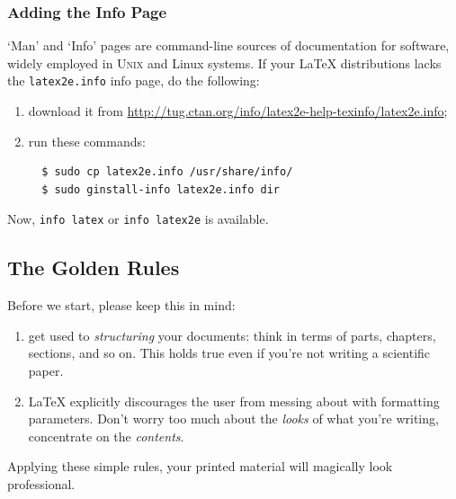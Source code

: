 \documentclass[a4paper,11pt]{article}
\def\unix    {\textsc{Unix}}
\newcommand{\cmdline}[1]
{\texttt{#1}}
\newcommand{\file}[1]
{\texttt{#1}}
\begin{document}

\subsubsection{Adding the Info Page}
\label{sec:infopage}

`Man' and `Info' pages are command-line sources of documentation for
software, widely employed in \unix{} and Linux systems. If your
\LaTeX{} distributions lacks the \file{latex2e.info} info page, do the
following:

\begin{enumerate}
  
  \item download it from
  \url{http://tug.ctan.org/info/latex2e-help-texinfo/latex2e.info};
  
  \item run these commands:
  
  \begin{verbatim}
  $ sudo cp latex2e.info /usr/share/info/
  $ sudo ginstall-info latex2e.info dir
  \end{verbatim}
   
\end{enumerate}

Now, \cmdline{info latex} or \cmdline{info latex2e} is available.



\subsection{The Golden Rules}

Before we start, please keep this in mind:

\begin{enumerate}

  \item get used to \emph{structuring} your documents: think in terms of
  parts, chapters, sections, and so on. This holds true even if you're
  not writing a scientific paper.

  \item \LaTeX{} explicitly discourages the user from messing about with
  formatting parameters. Don't worry too much about the \emph{looks}
  of what you're writing, concentrate on the \emph{contents}.

\end{enumerate}

Applying these simple rules, your printed material will magically look
professional.
\end{document}
